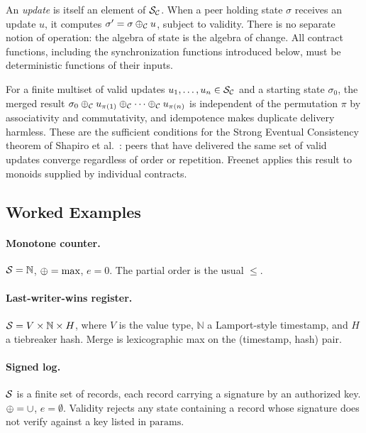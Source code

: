 An \emph{update} is itself an element of $\statespace_\contract$. When a peer holding state $\sigma$ receives an update $u$, it computes $\sigma' = \sigma \merge_\contract u$, subject to validity. There is no separate notion of operation: the algebra of state is the algebra of change. All contract functions, including the synchronization functions introduced below, must be deterministic functions of their inputs.

\begin{remark}[Convergence]
\label{rem:convergence}
For a finite multiset of valid updates $u_1, \ldots, u_n \in \statespace_\contract$ and a starting state $\sigma_0$, the merged result $\sigma_0 \merge_\contract u_{\pi(1)} \merge_\contract \cdots \merge_\contract u_{\pi(n)}$ is independent of the permutation $\pi$ by associativity and commutativity, and idempotence makes duplicate delivery harmless. These are the sufficient conditions for the Strong Eventual Consistency theorem of Shapiro et al.\ \citep{shapiro2011crdt}: peers that have delivered the same set of valid updates converge regardless of order or repetition. Freenet applies this result to monoids supplied by individual contracts.
\end{remark}

\subsection{Worked Examples}

\paragraph{Monotone counter.} $\statespace = \mathbb{N}$, $\merge = \max$, $e = 0$. The partial order is the usual $\leq$.

\paragraph{Last-writer-wins register.} $\statespace = V \times \mathbb{N} \times H$, where $V$ is the value type, $\mathbb{N}$ a Lamport-style timestamp, and $H$ a tiebreaker hash. Merge is lexicographic max on the (timestamp, hash) pair.

\paragraph{Signed log.} $\statespace$ is a finite set of records, each record carrying a signature by an authorized key. $\merge = \cup$, $e = \emptyset$. Validity rejects any state containing a record whose signature does not verify against a key listed in $\mathrm{params}$.

